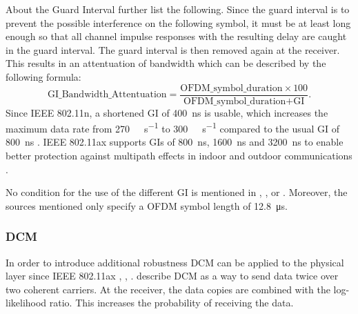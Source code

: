 About the Guard Interval \textcite{pulimamidi_development_2007} further list the following. 
Since the guard interval is to prevent the possible interference on the following symbol, it must be at least long enough so that all channel impulse responses with the resulting delay are caught in the guard interval. 
The guard interval is then removed again at the receiver. This results in an attentuation of bandwidth which can be described
by the following formula:
\begin{equation}\label{eq:GI}
	\text{GI\_Bandwidth\_Attentuation} =
	\frac{
		\text{OFDM\_symbol\_duration} \times 100
	}{
		\text{OFDM\_symbol\_duration} + \text{GI}
	}
	.
\end{equation}
Since IEEE 802.11n, a shortened \ac{GI} of \SI{400}{\nano\second} is usable, which increases the maximum data rate from \SI{270}{\mega\bit\per\second} to \SI{300}{\mega\bit\per\second} compared to the usual \ac{GI} of \SI{800}{\nano\second} \cite{sauter_wireless_2022}.
IEEE 802.11ax supports \ac{GI}s of \SI{800}{\nano\second}, \SI{1600}{\nano\second} and \SI{3200}{\nano\second} to
enable better protection against  multipath effects in indoor and outdoor communications \cite{deng_ieee_2017}.

No condition for the use of the different \ac{GI} is mentioned in \cite{deng_ieee_2017}, \cite{mozaffariahrar_survey_2022}, \cite{Rochim} or \cite{afaqui_ieee_2017}. Moreover, the sources mentioned only specify a \ac{OFDM} symbol length of \SI{12.8}{\micro\second}.

\subsubsection*{\acf{DCM}}
In order to introduce additional robustness \ac{DCM} can be applied to the physical layer since IEEE 802.11ax \cite{jacob_system-level_2020}, \cite{triwinarko_phy_2021}, \cite{noauthor_ieee_2021}. \textcite{jacob_system-level_2020} describe \ac{DCM} as a way to send data twice over two coherent carriers. At the receiver, the data copies are combined with the log-likelihood ratio. This increases the probability of receiving the data.


